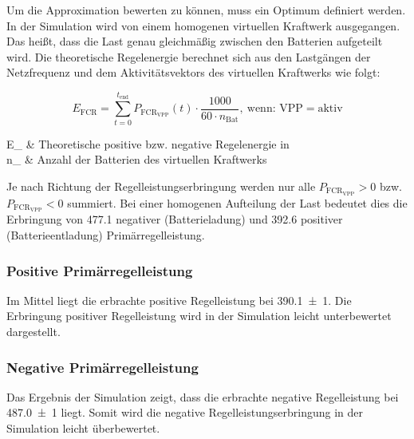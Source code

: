 Um die Approximation bewerten zu können, muss ein Optimum definiert werden. In der Simulation wird von einem homogenen virtuellen Kraftwerk ausgegangen. Das heißt, dass die Last genau gleichmäßig zwischen den Batterien aufgeteilt wird. Die theoretische Regelenergie berechnet sich aus den Lastgängen der Netzfrequenz und dem Aktivitätsvektors des virtuellen Kraftwerks wie folgt:

\begin{equation}
\label{eq:approx_FCR2}
	E_{\text{FCR}} = \sum_{t=0}^{t_{\text{end}}} P_{\text{FCR}_{\text{VPP}}}\left(t\right) \cdot \frac{1000}{60 \cdot n_{\text{Bat}}},~ \text{wenn: VPP} = \text{aktiv}
\end{equation}

\begin{conditions}
	E_{}	&		Theoretische positive bzw. negative Regelenergie in \SI{}{\kwh}\\
	n_{}		&		Anzahl der Batterien des virtuellen Kraftwerks\\
\end{conditions}

\noindent Je nach Richtung der Regelleistungserbringung werden nur alle $P_{\text{FCR}_{\text{VPP}}} > 0$  bzw. \linebreak $P_{\text{FCR}_{\text{VPP}}} < 0$ summiert. Bei einer homogenen Aufteilung der Last bedeutet dies die Erbringung von \SI{477.1}{\kwh} negativer (Batterieladung) und \SI{392.6}{\kwh} positiver (Batterieentladung) Primärregelleistung.

\subsubsection*{Positive Primärregelleistung}

Im Mittel liegt die erbrachte positive Regelleistung bei \SI[multi-part-units = single]{390.1(10)}{\kwh}. Die Erbringung positiver Regelleistung wird in der Simulation leicht unterbewertet dargestellt. 

\subsubsection*{Negative Primärregelleistung}

Das Ergebnis der Simulation zeigt, dass die erbrachte negative Regelleistung bei \linebreak \SI[multi-part-units = single]{487.0(10)}{\kwh} liegt. Somit wird die negative Regelleistungserbringung in der Simulation leicht überbewertet.

